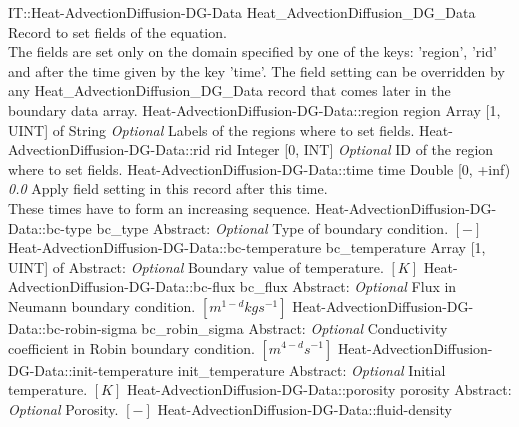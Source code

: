 \begin{RecordType}
	{IT::Heat-AdvectionDiffusion-DG-Data}
	{Heat{\_}AdvectionDiffusion{\_}DG{\_}Data}
	{} %
	{} %
	{{{Record to set fields of the equation.}\\{
The fields are set only on the domain specified by one of the keys: 'region', 'rid'}\\{
and after the time given by the key 'time'. The field setting can be overridden by}\\{
 any Heat{\_}AdvectionDiffusion{\_}DG{\_}Data record that comes later in the boundary data array.}}}
		\RecKey
			{Heat-AdvectionDiffusion-DG-Data::region}
			{region}
			{{Array [1, UINT] of }{String}}
			{ \it{Optional} }
			{{{Labels of the regions where to set fields. }}}
		\RecKey
			{Heat-AdvectionDiffusion-DG-Data::rid}
			{rid}
			{{Integer [0, INT]}}
			{ \it{Optional} }
			{{{ID of the region where to set fields.}}}
		\RecKey
			{Heat-AdvectionDiffusion-DG-Data::time}
			{time}
			{{Double [0, +inf)}}
			{ \it{0.0} }
			{{{Apply field setting in this record after this time.}\\{
These times have to form an increasing sequence.}}}
		\RecKey
			{Heat-AdvectionDiffusion-DG-Data::bc-type}
			{bc{\_}type}
			{{Abstract}{: }}
			{ \it{Optional} }
			{{{Type of boundary condition. }{$[-]$}}}
		\RecKey
			{Heat-AdvectionDiffusion-DG-Data::bc-temperature}
			{bc{\_}temperature}
			{{Array [1, UINT] of }{Abstract}{: }}
			{ \it{Optional} }
			{{{Boundary value of temperature. }{$[K]$}}}
		\RecKey
			{Heat-AdvectionDiffusion-DG-Data::bc-flux}
			{bc{\_}flux}
			{{Abstract}{: }}
			{ \it{Optional} }
			{{{Flux in Neumann boundary condition. }{$[m^{1-d}kgs^{-1}]$}}}
		\RecKey
			{Heat-AdvectionDiffusion-DG-Data::bc-robin-sigma}
			{bc{\_}robin{\_}sigma}
			{{Abstract}{: }}
			{ \it{Optional} }
			{{{Conductivity coefficient in Robin boundary condition. }{$[m^{4-d}s^{-1}]$}}}
		\RecKey
			{Heat-AdvectionDiffusion-DG-Data::init-temperature}
			{init{\_}temperature}
			{{Abstract}{: }}
			{ \it{Optional} }
			{{{Initial temperature. }{$[K]$}}}
		\RecKey
			{Heat-AdvectionDiffusion-DG-Data::porosity}
			{porosity}
			{{Abstract}{: }}
			{ \it{Optional} }
			{{{Porosity. }{$[-]$}}}
		\RecKey
			{Heat-AdvectionDiffusion-DG-Data::fluid-density}

\end{RecordType}
